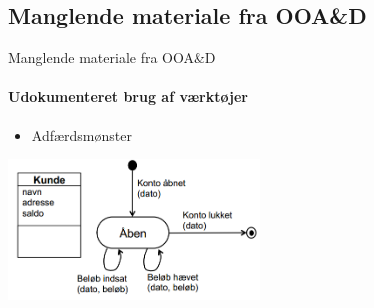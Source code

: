 \subsection{Manglende materiale fra OOA\&D}
\begin{frame}{Manglende materiale fra OOA\&D}
	\framesubtitle{Udokumenteret brug af værktøjer}
	\begin{itemize} 
    \item Adfærdsmønster
  \end{itemize}
  	 \vspace{4 mm}

  \includegraphics[width=0.5\textwidth]{images/adfaersmoenster.PNG}
\end{frame}